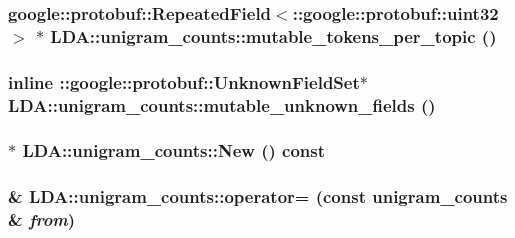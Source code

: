 \label{class_l_d_a_1_1unigram__counts_a28ad79f31ea7a42f773e4346e75cc11b}
\hypertarget{class_l_d_a_1_1unigram__counts_ab3888e03fa6596938fafec1d00131715}{
\subsubsection[{mutable\_\-tokens\_\-per\_\-topic}]{\setlength{\rightskip}{0pt plus 5cm}google::protobuf::RepeatedField$<$::google::protobuf::uint32 $>$ $\ast$ LDA::unigram\_\-counts::mutable\_\-tokens\_\-per\_\-topic ()}}
\label{class_l_d_a_1_1unigram__counts_ab3888e03fa6596938fafec1d00131715}
\hypertarget{class_l_d_a_1_1unigram__counts_a142f99b577a7f5ebf3edd3051176a923}{
\subsubsection[{mutable\_\-unknown\_\-fields}]{\setlength{\rightskip}{0pt plus 5cm}inline ::google::protobuf::UnknownFieldSet$\ast$ LDA::unigram\_\-counts::mutable\_\-unknown\_\-fields ()}}
\label{class_l_d_a_1_1unigram__counts_a142f99b577a7f5ebf3edd3051176a923}
\hypertarget{class_l_d_a_1_1unigram__counts_a058037380393e3158c703241ee45bd2e}{
\subsubsection[{New}]{ $\ast$ LDA::unigram\_\-counts::New () const}}
\label{class_l_d_a_1_1unigram__counts_a058037380393e3158c703241ee45bd2e}
\hypertarget{class_l_d_a_1_1unigram__counts_a977a022d9df1590f2be62efce720596b}{
\subsubsection[{operator=}]{\& LDA::unigram\_\-counts::operator= (const {\bf unigram\_\-counts} \& {\em from})}}
